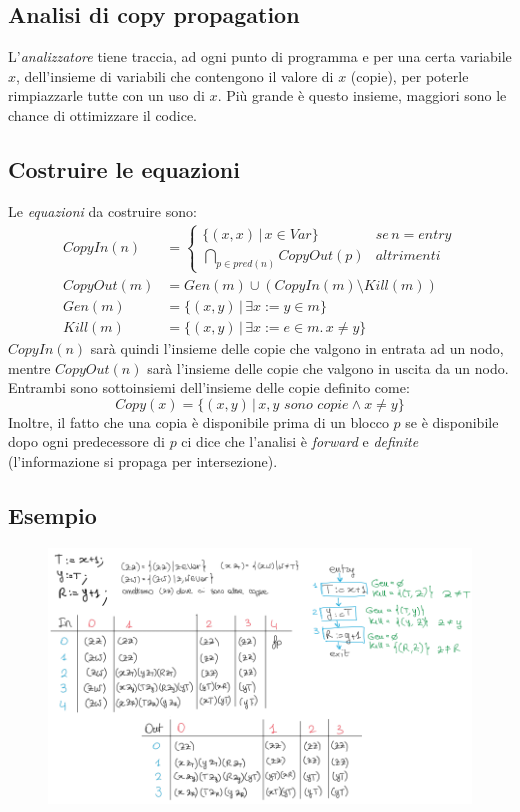 \documentclass[a4paper,oneside,titlepage]{book}
\begin{document}
\subsection{Analisi di copy propagation}
L'\textit{analizzatore} tiene traccia, ad ogni punto di programma e per una certa variabile $x$, dell'insieme di variabili che contengono il valore di $x$ (copie), per poterle rimpiazzarle tutte con un uso di $x$. Più grande è questo insieme, maggiori sono le chance di ottimizzare il codice.

\subsection{Costruire le equazioni}
\label{copy2}
Le \textit{equazioni} da costruire sono:
\begin{align*}
	CopyIn(n) &=
	\begin{cases}
		\{ (x,x) \, | \, x \in Var \} & se \, n=entry \\
		\bigcap_{p \in pred(n)} CopyOut(p) & altrimenti
	\end{cases} \\
	CopyOut(m) &= Gen(m) \cup (CopyIn(m) \setminus Kill(m)) \\
	Gen(m) &= \{ (x,y) \, | \, \exists x := y \in m \} \\
    Kill(m) &= \{ (x,y) \, | \, \exists x := e \in m. \, x \neq y \}
\end{align*}
$CopyIn(n)$ sarà quindi l'insieme delle copie che valgono in entrata ad un nodo, mentre $CopyOut(n)$ sarà l'insieme delle copie che valgono in uscita da un nodo. Entrambi sono sottoinsiemi dell'insieme delle copie definito come:
\[ Copy(x) = \{ (x,y) \, | \, x,y \,\, sono \,\, copie \wedge x \neq y \} \]
Inoltre, il fatto che una copia è disponibile prima di un blocco $p$ se è disponibile dopo ogni predecessore di $p$ ci dice che l'analisi è \textit{forward} e \textit{definite} (l'informazione si propaga per intersezione).

\newpage
\subsection{Esempio}
\label{copy4}
\begin{figure}[htp]
	\centering
	\includegraphics[width=\textwidth, height=\textheight, keepaspectratio]{copy2.png}
\end{figure}
\end{document}
